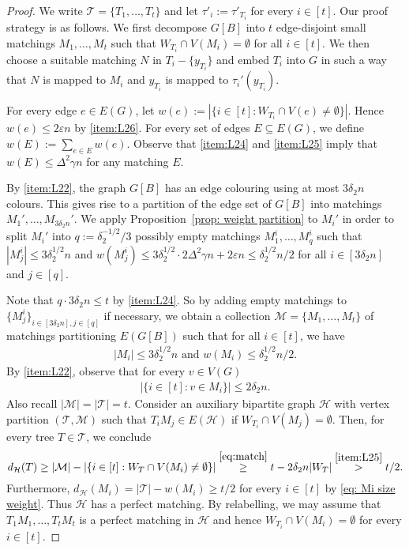 \documentclass[a4paper, 11pt, reqno]{amsart}
\numberwithin{equation}{section}
\newcommand{\1}{{\rm 1\hspace*{-0.4ex}%
\rule{0.1ex}{1.52ex}\hspace*{0.2ex}}}
\newcommand{\es}{\emptyset}
\newcommand{\cT}{\mathcal{T}}
\newcommand{\cH}{\mathcal{H}}
\newcommand{\cM}{\mathcal{M}}
\renewcommand{\epsilon}{\varepsilon}
\newcommand{\sub}{\subseteq}
\begin{document}
\begin{proof}
We write $\cT=\{T_1,\ldots,T_t\}$ and let $\tau'_i:=\tau'_{T_i}$ for every $i\in [t]$.
Our proof strategy is as follows.
We first decompose $G[B]$ into $t$ edge-disjoint small matchings $M_1,\ldots, M_t$ such that
$W_{T_i}\cap V(M_i)=\es$ for all $i\in [t]$.
We then choose a suitable matching $N$ in $T_i-\{y_{T_i}\}$ and embed $T_i$ into $G$
in such a way that $N$ is mapped to $M_i$ and $y_{T_i}$ is mapped to $\tau_i'(y_{T_i})$.

For every edge $e\in E(G)$, let $w(e):= |\{i\in [t]: W_{T_i} \cap V(e)\neq \es\}|$. 
Hence $w(e)\leq 2\epsilon n$ by \ref{item:L26}.
For every set of edges $E\sub E(G)$, 
we define $w(E):=\sum_{e\in E}w(e)$.
Observe that \ref{item:L24} and \ref{item:L25} imply that $w(E)\leq \Delta^2 \gamma n$ for any matching $E$.

By \ref{item:L22}, the graph $G[B]$ has an edge colouring using at most $3\delta_2 n$ colours. 
This gives rise to a partition of the edge set of $G[B]$ into matchings $M_1',\ldots,M_{3\delta_2 n}'$.
We apply Proposition~\ref{prop: weight partition} to $M_i'$ in order to split $M_i'$ into $q:=\delta_2^{-1/2}/3$ possibly empty matchings $M_1^i,\dots,M_q^i$ 
such that $|M_j^i|\leq 3\delta_2^{1/2}n$ and 
$w(M_j^i) \leq 3\delta_2^{1/2} \cdot 2\Delta^2\gamma n + 2\epsilon n\leq \delta^{1/2}_2 n/2$ for all $i\in[3\delta_2 n]$ and $j\in [q]$.

Note that $q\cdot 3\delta_2n \leq t$ by \ref{item:L24}. 
So by adding empty matchings to $\{M_j^i\}_{i\in[3\delta_2 n],j\in [q]}$ if necessary, we obtain a collection $\cM=\{M_1,\ldots,M_{t}\}$ of matchings partitioning $E(G[B])$ such that for all $i\in [t]$, we have
\begin{align}\label{eq: Mi size weight}
|M_i|\leq 3\delta_2^{1/2}n\text{ and } w(M_i) \leq \delta^{1/2}_2n/2.
\end{align}
By \ref{item:L22}, observe that for every $v\in V(G)$
\begin{align}\label{eq:match}
	|\{ i\in [t] : v\in M_i\}| \leq 2\delta_2 n.
\end{align}
Also recall $|\cM|= |\cT|=t$.
Consider an auxiliary bipartite graph $\cH$ with vertex partition $(\cT,\cM)$ such that $T_i M_j \in E(\cH)$ if $W_{T_i}\cap V(M_j)=\es$. 
Then, for every tree $T\in\cT$, 
we conclude 
$$d_{\cH}(T)\geq |\cM|- |\{ i\in[t]: W_{T} \cap V(M_i)\neq \es\}|
\stackrel{\eqref{eq:match}}{\geq} t - 2\delta_2 n |W_T|
\stackrel{\ref{item:L25}}{>} 
t/2.$$ 
Furthermore, $d_{\cH}(M_i) = |\cT| - w(M_i) \geq t/2$ for every $i\in [t]$ by \eqref{eq: Mi size weight}. 
Thus $\cH$ has a perfect matching. By relabelling, we may assume that $T_1M_1,\dots ,T_{t}M_{t}$ is a perfect matching in $\cH$ and 
hence $W_{T_i}\cap V(M_{i})=\es$ for every $i\in[t]$.


\end{proof}
\end{document}
